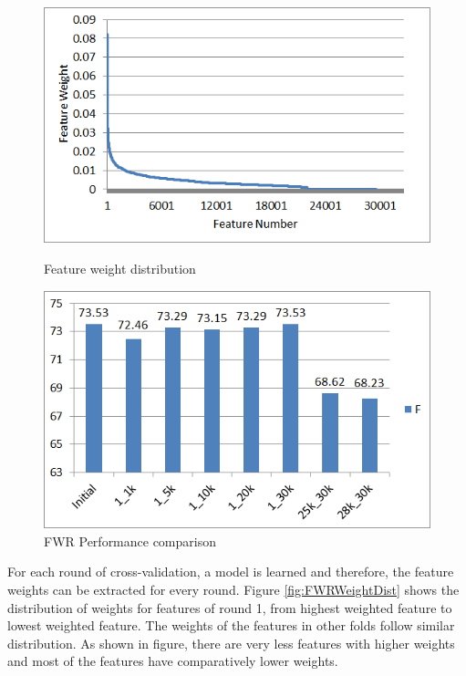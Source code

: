 \begin{figure}
\centering
\begin{minipage}{.5\textwidth}
  \centering
  \includegraphics[width=.95\textwidth]{figures/FWRWeightDist.png}
  \caption{Feature weight distribution}
  \label{fig:FWRWeightDist}
\end{minipage}%
\begin{minipage}{.5\textwidth}
  \centering
  \includegraphics[width=.95\textwidth]{figures/FWRPerformance.png}
  \caption{FWR Performance comparison}
  \label{fig:FWRPerfComp}
\end{minipage}
\end{figure} 

For each round of cross-validation, a model is learned and therefore, the feature weights can be extracted for every round. Figure \ref{fig:FWRWeightDist} shows the distribution of weights for features of round 1, from highest weighted feature to lowest weighted feature. The weights of the features in other folds follow similar distribution. As shown in figure, there are very less features with higher weights and most of the features have comparatively lower weights.

